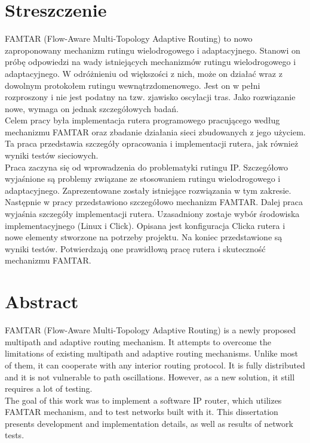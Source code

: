 \chapter*{Streszczenie}

FAMTAR (Flow-Aware Multi-Topology Adaptive Routing) to nowo zaproponowany mechanizm rutingu wielodrogowego i adaptacyjnego. Stanowi on próbę odpowiedzi na wady istniejących mechanizmów rutingu wielodrogowego i adaptacyjnego. W odróżnieniu od większości z nich, może on działać wraz z dowolnym protokołem rutingu wewnątrzdomenowego. Jest on w pełni rozproszony i nie jest podatny na tzw. zjawisko oscylacji tras. Jako rozwiązanie nowe, wymaga on jednak szczegółowych badań. \\

\noindent Celem pracy była implementacja rutera programowego pracującego według mechanizmu FAMTAR oraz zbadanie działania sieci zbudowanych z jego użyciem. Ta praca przedstawia szczegóły opracowania i implementacji rutera, jak również wyniki testów sieciowych. \\

\noindent Praca zaczyna się od wprowadzenia do problematyki rutingu IP. Szczegółowo wyjaśnione są problemy związane ze stosowaniem rutingu wielodrogowego i adaptacyjnego. Zaprezentowane zostały istniejące rozwiązania w tym zakresie. Następnie w pracy przedstawiono szczegółowo mechanizm FAMTAR. Dalej praca wyjaśnia szczegóły implementacji rutera. Uzasadniony zostaje wybór środowiska implementacyjnego (Linux i Click). Opisana jest konfiguracja Clicka rutera i nowe elementy stworzone na potrzeby projektu. Na koniec przedstawione są wyniki testów. Potwierdzają one prawidłową pracę rutera i skuteczność mechanizmu FAMTAR.

\chapter*{Abstract}

FAMTAR (Flow-Aware Multi-Topology Adaptive Routing) is a newly proposed multipath and adaptive routing mechanism. It attempts to overcome the limitations of existing multipath and adaptive routing mechanisms. Unlike most of them, it can cooperate with any interior routing protocol. It is fully distributed and it is not vulnerable to path oscillations. However, as a new solution, it still requires a lot of testing. \\

\noindent The goal of this work was to implement a software IP router, which utilizes \mbox{FAMTAR} mechanism, and to test networks built with it. This dissertation presents development and implementation details, as well as results of network tests. \\

